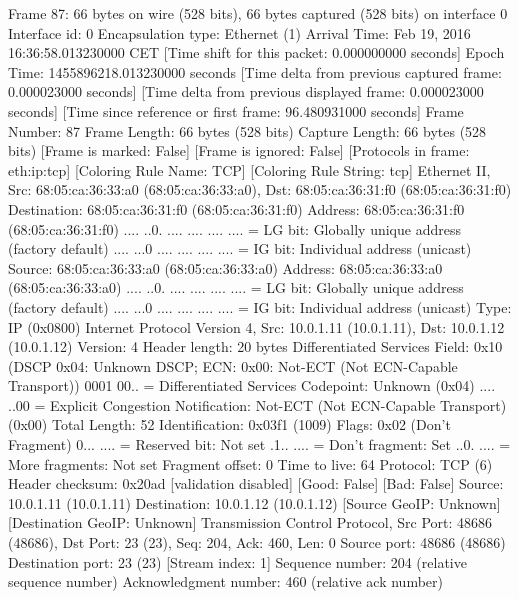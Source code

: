Frame 87: 66 bytes on wire (528 bits), 66 bytes captured (528 bits) on interface 0
    Interface id: 0
    Encapsulation type: Ethernet (1)
    Arrival Time: Feb 19, 2016 16:36:58.013230000 CET
    [Time shift for this packet: 0.000000000 seconds]
    Epoch Time: 1455896218.013230000 seconds
    [Time delta from previous captured frame: 0.000023000 seconds]
    [Time delta from previous displayed frame: 0.000023000 seconds]
    [Time since reference or first frame: 96.480931000 seconds]
    Frame Number: 87
    Frame Length: 66 bytes (528 bits)
    Capture Length: 66 bytes (528 bits)
    [Frame is marked: False]
    [Frame is ignored: False]
    [Protocols in frame: eth:ip:tcp]
    [Coloring Rule Name: TCP]
    [Coloring Rule String: tcp]
Ethernet II, Src: 68:05:ca:36:33:a0 (68:05:ca:36:33:a0), Dst: 68:05:ca:36:31:f0 (68:05:ca:36:31:f0)
    Destination: 68:05:ca:36:31:f0 (68:05:ca:36:31:f0)
        Address: 68:05:ca:36:31:f0 (68:05:ca:36:31:f0)
        .... ..0. .... .... .... .... = LG bit: Globally unique address (factory default)
        .... ...0 .... .... .... .... = IG bit: Individual address (unicast)
    Source: 68:05:ca:36:33:a0 (68:05:ca:36:33:a0)
        Address: 68:05:ca:36:33:a0 (68:05:ca:36:33:a0)
        .... ..0. .... .... .... .... = LG bit: Globally unique address (factory default)
        .... ...0 .... .... .... .... = IG bit: Individual address (unicast)
    Type: IP (0x0800)
Internet Protocol Version 4, Src: 10.0.1.11 (10.0.1.11), Dst: 10.0.1.12 (10.0.1.12)
    Version: 4
    Header length: 20 bytes
    Differentiated Services Field: 0x10 (DSCP 0x04: Unknown DSCP; ECN: 0x00: Not-ECT (Not ECN-Capable Transport))
        0001 00.. = Differentiated Services Codepoint: Unknown (0x04)
        .... ..00 = Explicit Congestion Notification: Not-ECT (Not ECN-Capable Transport) (0x00)
    Total Length: 52
    Identification: 0x03f1 (1009)
    Flags: 0x02 (Don't Fragment)
        0... .... = Reserved bit: Not set
        .1.. .... = Don't fragment: Set
        ..0. .... = More fragments: Not set
    Fragment offset: 0
    Time to live: 64
    Protocol: TCP (6)
    Header checksum: 0x20ad [validation disabled]
        [Good: False]
        [Bad: False]
    Source: 10.0.1.11 (10.0.1.11)
    Destination: 10.0.1.12 (10.0.1.12)
    [Source GeoIP: Unknown]
    [Destination GeoIP: Unknown]
Transmission Control Protocol, Src Port: 48686 (48686), Dst Port: 23 (23), Seq: 204, Ack: 460, Len: 0
    Source port: 48686 (48686)
    Destination port: 23 (23)
    [Stream index: 1]
    Sequence number: 204    (relative sequence number)
    Acknowledgment number: 460    (relative ack number)

